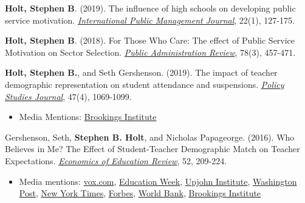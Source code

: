 \documentclass[margin,line]{res}
\begin{document}
\begin{resume}
\textbf{Holt, Stephen B}. (2019). The influence of high schools on developing public service motivation. \href{https://doi.org/10.1080/10967494.2018.1470120}{\textit{International Public Management Journal}}, 22(1), 127-175.

\textbf{Holt, Stephen B}. (2018). For Those Who Care: The effect of Public Service Motivation on Sector Selection. \href{http://doi.org/10.1111/puar.12906}{\textit{Public Administration Review}}, 78(3), 457-471.

\textbf{Holt, Stephen B.}, and Seth Gershenson. (2019). The impact of teacher demographic representation on student attendance and suspensions. \href{http://doi.org/10.1111/psj.12229}{\textit{Policy Studies Journal}}, 47(4), 1069-1099.
\begin{itemize}
\item[] Media Mentions: \href{https://www.brookings.edu/blog/brown-center-chalkboard/2019/04/02/the-teacher-diversity-gap-is-literally-inherited/}{Brookings Institute}
\end{itemize}

Gershenson, Seth, \textbf{Stephen B. Holt}, and Nicholas Papageorge. (2016). Who Believes in Me? The Effect of Student-Teacher Demographic Match on Teacher Expectations. \href{https://doi.org/10.1016/j.econedurev.2016.03.002}{\textit{Economics of Education Review}}, 52, 209-224.

\begin{itemize}
\item[] Media mentions: \href{https://www.vox.com/policy-and-politics/2015/8/19/9178573/teacher-students-race-study}{vox.com}, \href{http://blogs.edweek.org/edweek/inside-school-research/2015/09/racial_mismatch_changes_teache.html?cmp=soc-edit-tw}{Education Week}, \href{http://www.upjohn.org/research-highlights/are-teachers\%E2\%80\%99-expectations-students-systematically-biased}{Upjohn Institute}, \href{https://www.washingtonpost.com/news/answer-sheet/wp/2017/04/09/study-black-students-from-poor-families-are-more-likely-to-graduate-high-school-if-they-have-at-least-one-black-teacher/?utm_term=.38baf7bc6467}{Washington Post}, \href{https://www.nytimes.com/2019/01/15/upshot/the-gender-achievement-gap-starts-later-for-asian-american-students.html}{New York Times}, \href{https://www.forbes.com/sites/nataliewexler/2018/09/14/why-we-need-a-teacher-workforce-thats-both-diverse-and-knowledgeable/#4f36a3407f3c}{Forbes}, \href{https://openknowledge.worldbank.org/handle/10986/29883}{World Bank}, \href{https://www.brookings.edu/research/high-hopes-and-harsh-realities-the-real-challenges-to-building-a-diverse-teacher-workforce/}{Brookings Institute}
\end{itemize}


\end{resume}
\end{document}
